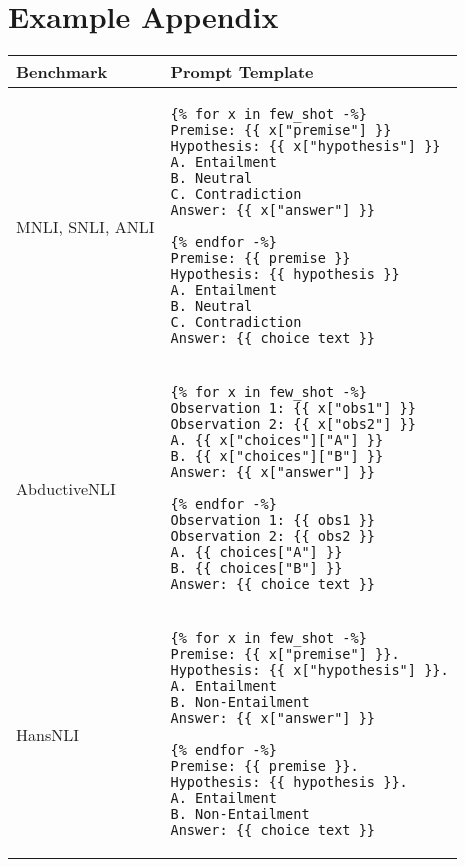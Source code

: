 \section{Example Appendix}
\label{sec:appendix}

\begin{table*}[t]
    \centering
    \small
    \begin{tabular}{lp{8cm}}
        \toprule
        \textbf{Benchmark} & \textbf{Prompt Template} \\
        \midrule
        MNLI, SNLI, ANLI & \begin{verbatim}
{% for x in few_shot -%}
Premise: {{ x["premise"] }}
Hypothesis: {{ x["hypothesis"] }}
A. Entailment
B. Neutral
C. Contradiction
Answer: {{ x["answer"] }}

{% endfor -%}
Premise: {{ premise }}
Hypothesis: {{ hypothesis }}
A. Entailment
B. Neutral
C. Contradiction
Answer: {{ choice_text }}
\end{verbatim} \\
\midrule
AbductiveNLI & \begin{verbatim}
{% for x in few_shot -%}
Observation 1: {{ x["obs1"] }}
Observation 2: {{ x["obs2"] }}
A. {{ x["choices"]["A"] }}
B. {{ x["choices"]["B"] }}
Answer: {{ x["answer"] }}

{% endfor -%}
Observation 1: {{ obs1 }}
Observation 2: {{ obs2 }}
A. {{ choices["A"] }}
B. {{ choices["B"] }}
Answer: {{ choice_text }}
\end{verbatim} \\
\midrule
HansNLI & \begin{verbatim}
{% for x in few_shot -%}
Premise: {{ x["premise"] }}.
Hypothesis: {{ x["hypothesis"] }}.
A. Entailment
B. Non-Entailment
Answer: {{ x["answer"] }}

{% endfor -%}
Premise: {{ premise }}.
Hypothesis: {{ hypothesis }}.
A. Entailment
B. Non-Entailment
Answer: {{ choice_text }}
\end{verbatim} \\
\bottomrule
\end{tabular}
\caption{Prompt Templates for each task}
\label{tab:prompt_template}
\end{table*}